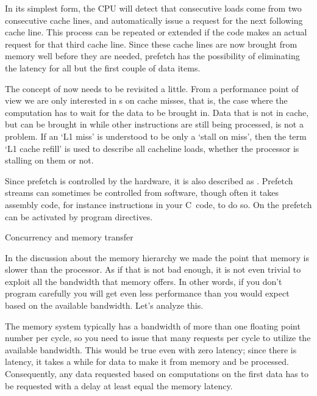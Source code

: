 In its simplest form, the CPU will detect that consecutive loads come
from two consecutive cache lines, and automatically issue a request
for the next following cache line. This process can be repeated or
extended if the code makes an actual request for that third cache
line. Since these cache lines are now brought from memory well before
they are needed, prefetch has the possibility of eliminating the
latency for all but the first couple of data items.

The concept of  now needs to be revisited a
little. From a performance point of view we are only interested in
s on cache misses, that is, the case where the
computation has to wait for the data to be brought in. Data that is
not in cache, but can be brought in while other instructions are still
being processed, is not a problem. If an `L1 miss' is understood to be
only a `stall on miss', then the term `L1 cache refill' is used to
describe all cacheline loads, whether the processor is stalling on
them or not.

Since prefetch is controlled by the hardware, it is also described as
.  Prefetch streams can sometimes be
controlled from software, though often it takes assembly code,
for instance  instructions in your C~code,
to do so. On the  prefetch can be
activated by program directives.

 {Concurrency and memory transfer}

In the discussion about the memory hierarchy we made the point that
memory is slower than the processor. As if that is not bad enough, it
is not even trivial to exploit all the bandwidth that memory
offers. In other words, if you don't program carefully you will get
even less performance than you would expect based on the available
bandwidth. Let's analyze this.

The memory system typically has a bandwidth of more than one floating
point number per cycle, so you need to issue that many requests per
cycle to utilize the available bandwidth. This would be true even with
zero latency; since there is latency, it takes a while for data to
make it from memory and be processed. Consequently, any data requested
based on computations on the first data has to be requested with a
delay at least equal the memory latency.

